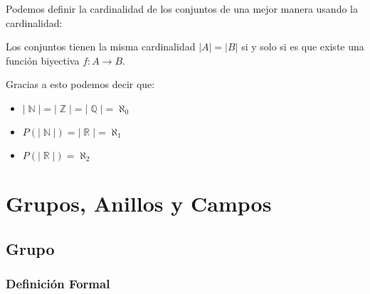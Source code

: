 \documentclass[12pt, fleqn]{report}                             %
\DeclareMathOperator \Naturals  {\mathbb{N}}                     %
\DeclareMathOperator \Integers  {\mathbb{Z}}                     %
\DeclareMathOperator \Racionals {\mathbb{Q}}                     %
\DeclareMathOperator \Reals     {\mathbb{R}}                     %
\begin{document}
            Podemos definir la cardinalidad de los conjuntos de una mejor manera
            usando la cardinalidad:

            Los conjuntos tienen la misma cardinalidad $|A| = |B|$ si y solo si es que existe
            una función biyectiva $f : A \to B$.


            Gracias a esto podemos decir que:

            \begin{itemize} 
                \item $|\Naturals| = |\Integers| = |\Racionals| = \aleph_0$

                \item $P(|\Naturals|) = |\Reals| = \aleph_1$

                \item $P(|\Reals|) = \aleph_2$

            \end{itemize} 





    \chapter{Grupos, Anillos y Campos}
        \clearpage


        \clearpage
        \section{Grupo}

            \subsection{Definición Formal}
\end{document}
